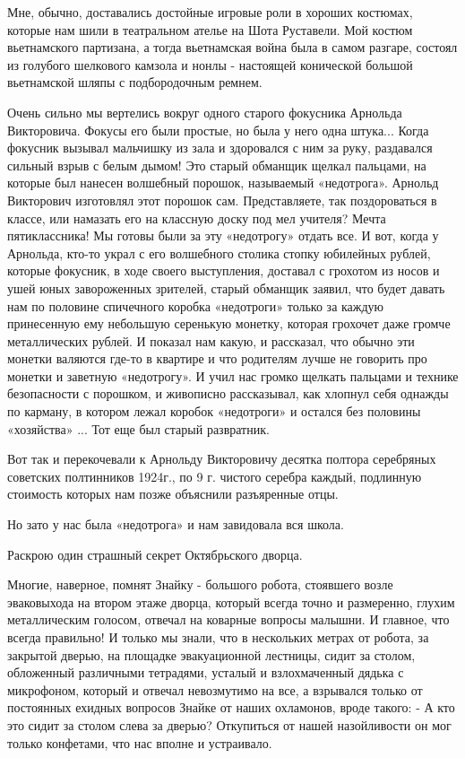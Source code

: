
Мне, обычно, доставались достойные игровые роли в хороших костюмах, которые нам
шили в театральном ателье на Шота Руставели. Мой костюм вьетнамского партизана,
а тогда вьетнамская война была в самом разгаре, состоял из голубого шелкового
камзола и нонлы - настоящей конической большой вьетнамской шляпы с
подбородочным ремнем.


Очень сильно мы вертелись вокруг одного старого фокусника Арнольда Викторовича.
Фокусы его были простые, но была у него одна штука... Когда фокусник вызывал
мальчишку из зала и здоровался с ним за руку, раздавался сильный взрыв с белым
дымом! Это старый обманщик щелкал пальцами, на которые был нанесен волшебный
порошок, называемый «недотрога». Арнольд Викторович изготовлял этот порошок
сам. Представляете, так поздороваться в классе, или намазать его на классную
доску под мел учителя? Мечта пятиклассника! Мы готовы были за эту «недотрогу»
отдать все.  И вот, когда у Арнольда, кто-то украл с его волшебного столика
стопку юбилейных рублей, которые фокусник, в ходе своего выступления, доставал
с грохотом из носов и ушей юных завороженных зрителей, старый обманщик заявил,
что будет давать нам по половине спичечного коробка «недотроги» только за
каждую принесенную ему небольшую серенькую монетку, которая грохочет даже
громче металлических рублей. И показал нам какую, и рассказал, что обычно эти
монетки валяются где-то в квартире и что родителям лучше не говорить про
монетки и заветную «недотрогу». И учил нас громко щелкать пальцами и технике
безопасности с порошком, и живописно рассказывал, как хлопнул себя однажды по
карману, в котором лежал коробок «недотроги» и остался без половины «хозяйства»
...  Тот еще был старый развратник.

Вот так и перекочевали к Арнольду Викторовичу десятка полтора серебряных
советских полтинников 1924г., по 9 г. чистого серебра каждый, подлинную
стоимость которых нам позже объяснили разъяренные отцы. 

Но зато у нас была «недотрога» и нам завидовала вся школа.

Раскрою один страшный секрет Октябрьского дворца.

Многие, наверное, помнят Знайку - большого робота, стоявшего возле эваковыхода
на втором этаже дворца, который всегда точно и размеренно, глухим металлическим
голосом, отвечал на коварные вопросы малышни. И главное, что всегда правильно!
И только мы знали, что в нескольких метрах от робота, за закрытой дверью, на
площадке эвакуационной лестницы, сидит за столом, обложенный различными
тетрадями, усталый и взлохмаченный дядька с микрофоном, который и отвечал
невозмутимо на все, а взрывался только от постоянных ехидных вопросов Знайке от
наших охламонов, вроде такого: - А кто это сидит за столом слева за дверью?
Откупиться от нашей назойливости он мог только конфетами, что нас вполне и
устраивало.

